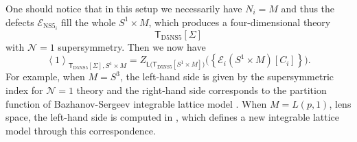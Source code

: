 One should notice that in this setup we necessarily have $N_{i}=M$
and thus the defects $\mathcal{E}_{\mathrm{NS}5_{i}}$ fill the whole
$S^{1}\times M$, which produces a four-dimensional theory
\begin{equation*}
  \mathsf{T}_{\mathrm{D5NS5}}[\Sigma]
\end{equation*}
with $\mathcal{N}=1$ supersymmetry. Then we now have
\begin{equation}
  \left\langle  1  \right\rangle_{\mathsf{T}_{\mathrm{D5NS5}}[\Sigma], S^{1}\times M}
    =Z_{\mathsf{L}\big(\mathsf{T}_{\mathrm{D5NS5}}[S^{1}\times M]\big)}
      \big( \left\{ \mathcal{E}_{i}(S^{1}\times M) [C_i]\right\} \big).
\end{equation}
For example, when $M=S^{3}$, the left-hand side is given by the supersymmetric
index for $\mathcal{N}=1$ theory and the right-hand side corresponds
to the partition function of Bazhanov-Sergeev integrable lattice model
\cite{Bazhanov:2010kz,Bazhanov:2011mz,Spiridonov:2010em,Yamazaki:2012cp}. When $M=L(p,1)$,
lens space, the left-hand side is computed in \cite{Yamazaki:2013nra}, which
defines a new integrable lattice model through this correspondence.

